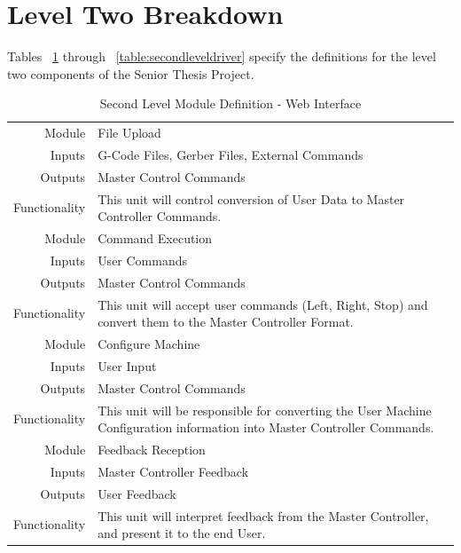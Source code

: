 \section{Level Two Breakdown}
Tables ~\ref{table:secondlevelweb} through ~\ref{table:secondleveldriver} specify the definitions for the level two components of the Senior Thesis Project.
\begin{table}[H] 
	\caption{Second Level Module Definition - Web Interface}
	\label{table:secondlevelweb}
	\centering 
	\begin{tabular}{|r p{10cm}|} 
		\hline\hline 
		Module		& File Upload \\ 
		Inputs		& G-Code Files, Gerber Files, External Commands	\\ 
		Outputs		& Master Control Commands \\ 
		Functionality	& This unit will control conversion of User Data to Master Controller Commands.\\ 
		\hline\hline 
		Module		& Command Execution \\ 
		Inputs		& User Commands	\\ 
		Outputs		& Master Control Commands \\ 
		Functionality	& This unit will accept user commands (Left, Right, Stop) and convert them to the Master Controller Format.\\
		\hline\hline 
		Module		& Configure Machine \\ 
		Inputs		& User Input \\ 
		Outputs		& Master Control Commands \\ 
		Functionality	& This unit will be responsible for converting the User Machine Configuration information into Master Controller Commands.\\
		\hline\hline 
		Module		& Feedback Reception \\ 
		Inputs		& Master Controller Feedback \\ 
		Outputs		& User Feedback \\ 
		Functionality	& This unit will interpret feedback from the Master Controller, and present it to the end User. \\
		\hline
		\end{tabular} 
\end{table}

